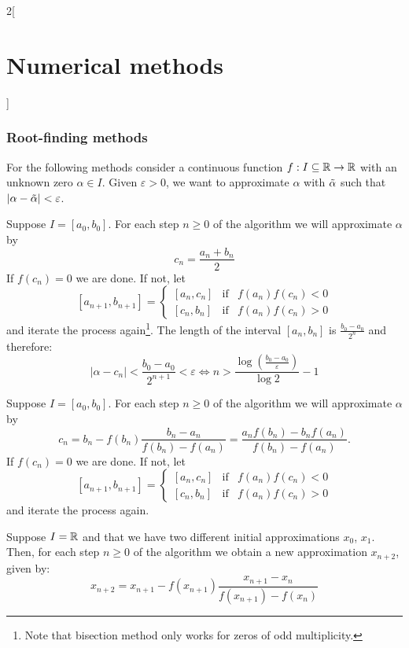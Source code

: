 \documentclass[../../../main.tex]{subfiles}
\begin{document}
\begin{multicols}{2}[\section{Numerical methods}]
    \subsubsection*{Root-finding methods}
    For the following methods consider a continuous function $f:I\subseteq\mathbb{R}\rightarrow\mathbb{R}$ with an unknown zero $\alpha\in I$. Given $\varepsilon>0$, we want to approximate $\alpha$ with $\Tilde{\alpha}$ such that $|\alpha-\Tilde{\alpha}|<\varepsilon$.
    \begin{method}
        Suppose $I=[a_0,b_0]$. For each step $n\geq 0$ of the algorithm we will approximate $\alpha$ by $$c_n=\frac{a_n+b_n}{2}$$ If $f(c_n)=0$ we are done. If not, let
        $$[a_{n+1},b_{n+1}]=\left\{
            \begin{array}{ccc}
                [a_n,c_n]            & \text{if} & f(a_n)f(c_n)<0 \\
                \left[c_n,b_n\right] & \text{if} & f(a_n)f(c_n)>0
            \end{array}\right.$$
        and iterate the process again\footnote{Note that bisection method only works for zeros of odd multiplicity.}. The length of the interval $[a_n,b_n]$ is $\frac{b_0-a_0}{2^n}$ and therefore: $$|\alpha-c_n|<\frac{b_0-a_0}{2^{n+1}}<\varepsilon\iff n>\frac{\log\left(\frac{b_0-a_0}{\varepsilon}\right)}{\log 2}-1$$
    \end{method}
    \begin{method}
        Suppose $I=[a_0,b_0]$. For each step $n\geq 0$ of the algorithm we will approximate $\alpha$ by $$c_n=b_n-f(b_n)\frac{b_n-a_n}{f(b_n)-f(a_n)}=\frac{a_nf(b_n)-b_nf(a_n)}{f(b_n)-f(a_n)}.$$ If $f(c_n)=0$ we are done. If not, let
        $$[a_{n+1},b_{n+1}]=\left\{
            \begin{array}{ccc}
                [a_n,c_n]            & \text{if} & f(a_n)f(c_n)<0 \\
                \left[c_n,b_n\right] & \text{if} & f(a_n)f(c_n)>0
            \end{array}\right.$$
        and iterate the process again.
    \end{method}
    \begin{method}
        Suppose $I=\mathbb{R}$ and that we have two different initial approximations $x_0$, $x_1$. Then, for each step $n\geq 0$ of the algorithm we obtain a new approximation $x_{n+2}$, given by: $$x_{n+2}=x_{n+1}-f(x_{n+1})\frac{x_{n+1}-x_n}{f(x_{n+1})-f(x_n)}$$
    \end{method}
    \begin{method}

\end{method}
\end{multicols}
\end{document}
